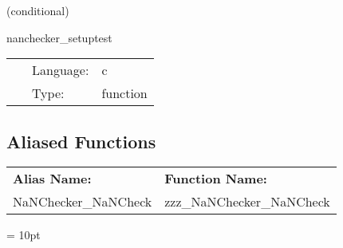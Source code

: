 \documentclass{article}
\begin{document}
\vspace{5mm}

   (conditional) 

\hspace{5mm} nanchecker\_setuptest 

\hspace{5mm}{\it set test grid function to nan } 


\hspace{5mm}

 \begin{tabular*}{160mm}{cll} 
~ & Language:  & c \\ 
~ & Type:  & function \\ 
\end{tabular*} 


\subsection*{Aliased Functions}

\hspace{5mm}

 \begin{tabular*}{160mm}{ll} 

{\bf Alias Name:} ~~~~~~~ & {\bf Function Name:} \\ 
NaNChecker\_NaNCheck & zzz\_NaNChecker\_NaNCheck \\ 
\end{tabular*} 



\vspace{5mm}\parskip = 10pt 
\end{document}
